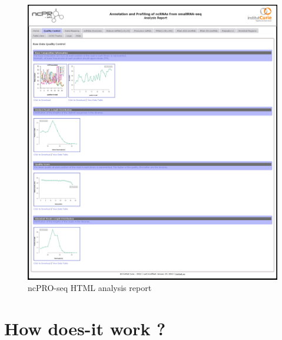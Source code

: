 \documentclass[12pt]{article}
\def \ncpip{ncPRO-seq}
\begin{document}
\begin{figure}[!h]
\includegraphics[width=\textwidth]{web_9.png}
\caption{\ncpip{} HTML analysis report}
\label{fig:report}
\end{figure}
\newpage

\section{How does-it work ?}
\end{document}
